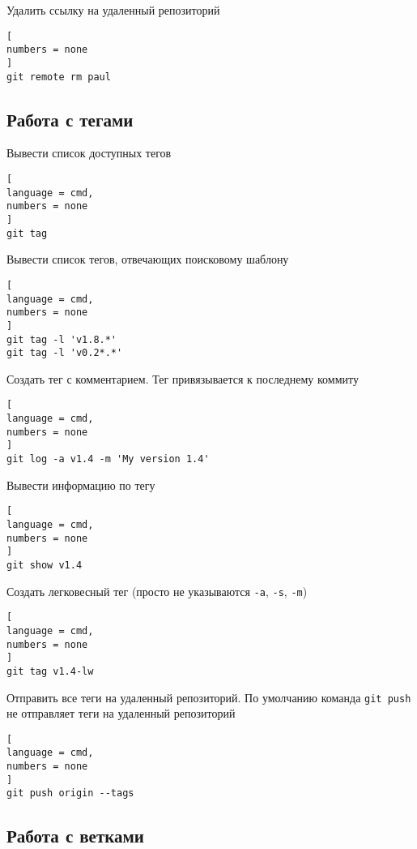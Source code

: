 \documentclass[%
	11pt,
	a4paper,
	utf8,
		]{article}
\begin{document}
Удалить ссылку на удаленный репозиторий

\begin{lstlisting}[
numbers = none
]
git remote rm paul
\end{lstlisting}


\subsection{Работа с тегами}

Вывести список доступных тегов

\begin{lstlisting}[
language = cmd,
numbers = none
]
git tag
\end{lstlisting}


Вывести список тегов, отвечающих поисковому  шаблону

\begin{lstlisting}[
language = cmd,
numbers = none
]
git tag -l 'v1.8.*'
git tag -l 'v0.2*.*'
\end{lstlisting}


Создать тег с комментарием. Тег привязывается к последнему коммиту

\begin{lstlisting}[
language = cmd,
numbers = none
]
git log -a v1.4 -m 'My version 1.4'
\end{lstlisting}

Вывести информацию по тегу

\begin{lstlisting}[
language = cmd,
numbers = none
]
git show v1.4
\end{lstlisting}


Создать легковесный тег (просто не указываются \texttt{-a}, \texttt{-s}, \texttt{-m})

\begin{lstlisting}[
language = cmd,
numbers = none
]
git tag v1.4-lw
\end{lstlisting}


Отправить все теги на удаленный репозиторий. По умолчанию команда \texttt{git push} не отправляет теги на удаленный репозиторий

\begin{lstlisting}[
language = cmd,
numbers = none
]
git push origin --tags
\end{lstlisting}


\subsection{Работа с ветками}
\end{document}
